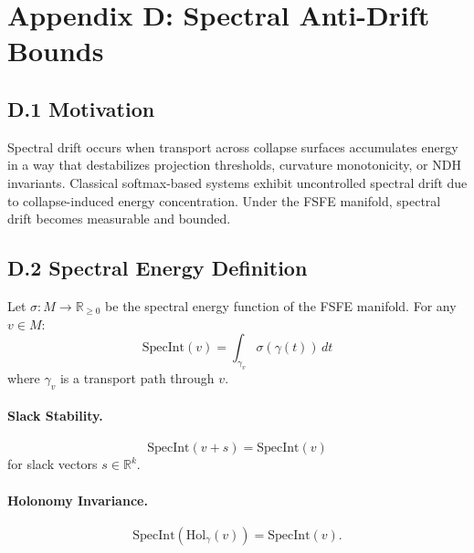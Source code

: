 
\appendix
\section{Appendix D: Spectral Anti-Drift Bounds}
\label{appendix:spectralantidrift}

\subsection{D.1 Motivation}

Spectral drift occurs when transport across collapse surfaces accumulates
energy in a way that destabilizes projection thresholds, curvature monotonicity,
or NDH invariants. Classical softmax-based systems exhibit uncontrolled spectral
drift due to collapse-induced energy concentration. Under the FSFE manifold,
spectral drift becomes measurable and bounded.

\subsection{D.2 Spectral Energy Definition}

Let $\sigma : M \rightarrow \mathbb{R}_{\ge 0}$ be the spectral energy function
of the FSFE manifold. For any $v \in M$:
\[
\mathrm{SpecInt}(v) = \int_{\gamma_v} \sigma(\gamma(t)) \, dt
\]
where $\gamma_v$ is a transport path through $v$.

\paragraph{Slack Stability.}
\[
\mathrm{SpecInt}(v + s) = \mathrm{SpecInt}(v)
\]
for slack vectors $s \in \mathbb{R}^k$.

\paragraph{Holonomy Invariance.}
\[
\mathrm{SpecInt}(\mathrm{Hol}_\gamma(v)) = \mathrm{SpecInt}(v).
\]

